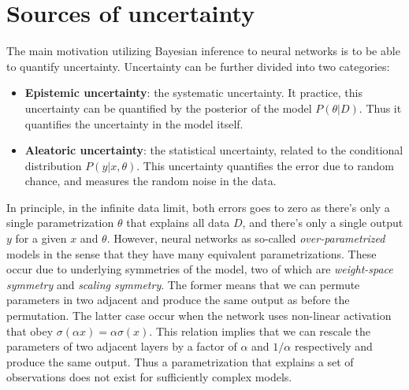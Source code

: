 \section{Sources of uncertainty}
The main motivation utilizing Bayesian inference to neural networks is to be able to quantify uncertainty. 
Uncertainty can be further divided into two categories:
\begin{itemize}
  \item \textbf{Epistemic uncertainty}: the systematic uncertainty. It practice, this uncertainty can be quantified by 
  the posterior of the model $P(\theta|D)$. Thus it quantifies the uncertainty in the model itself.
  \item \textbf{Aleatoric uncertainty}: the statistical uncertainty, related to the conditional distribution $P(y|x, \theta)$.
  This uncertainty quantifies the error due to random chance, and measures the random noise in the data.
\end{itemize}
In principle, in the infinite data limit, both errors goes to zero as there's only a single parametrization $\theta$ that explains all data $D$,
and there's only a single output $y$ for a given $x$ and $\theta$. However, neural networks as so-called \textit{over-parametrized}
models in the sense that they have many equivalent parametrizations. These occur due to underlying symmetries of the model, 
two of which are \textit{weight-space symmetry} and \textit{scaling symmetry}. The former means that we can permute parameters
in two adjacent and produce the same output as before the permutation. 
The latter case occur when the network uses non-linear activation that obey $\sigma(\alpha x) = \alpha \sigma(x)$. 
This relation implies that we can rescale the parameters 
of two adjacent layers by a factor of $\alpha$ and $1/\alpha$ respectively and produce the same output. Thus a parametrization
that explains a set of observations does not exist for sufficiently complex models.

